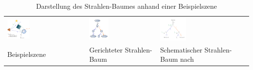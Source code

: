 \begin{table}[H]
    \centering
    \caption{Darstellung des Strahlen-Baumes anhand einer
        Beispielszene}\label{table:ray_tracing:ray_tree}
    \begin{tabular}{p{}p{}p{}}
        \toprule
            \includegraphics[width=0.3\textwidth]{img/ray_tracing_scene_ray_tree.pdf} &
            \includegraphics[width=0.3\textwidth]{img/ray_tracing_tree.pdf} &
            \includegraphics[width=0.3\textwidth]{img/ray_tracing_tree_schematic.pdf} \\
            Beispielszene &
            Gerichteter Strahlen-Baum &
            Schematischer Strahlen-Baum
            nach~\citeauthor{glassner_introduction_1989} \\
        \bottomrule
    \end{tabular}
\end{table}

